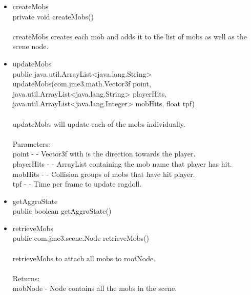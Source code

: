 \documentclass[letterpaper]{article}
\begin{document}
\begin{itemize}
\begin{itemize}
											\item	createMobs \\
													private void createMobs() \\ \\
													createMobs creates each mob and adds it to the list of mobs as well as the scene node. \\
											\item	updateMobs \\
													public java.util.ArrayList<java.lang.String> updateMobs(com.jme3.math.Vector3f point,
													                                               java.util.ArrayList<java.lang.String> playerHits,
													                                               java.util.ArrayList<java.lang.Integer> mobHits,
													                                               float tpf) \\ \\
													updateMobs will update each of the mobs individually. \\ \\
													Parameters: \\
													point - - Vector3f with is the direction towards the player. \\
													playerHits - - ArrayList containing the mob name that player has hit. \\
													mobHits - - Collision groups of mobs that have hit player. \\
													tpf - - Time per frame to update ragdoll. \\
											\item	getAggroState \\
													public boolean getAggroState() \\
											\item	retrieveMobs \\
													public com.jme3.scene.Node retrieveMobs() \\ \\
													retrieveMobs to attach all mobs to rootNode. \\ \\
													Returns: \\
													mobNode - Node contains all the mobs in the scene.
										\end{itemize}
							\end{itemize}
						
						\vspace{0.2in}
\end{document}
